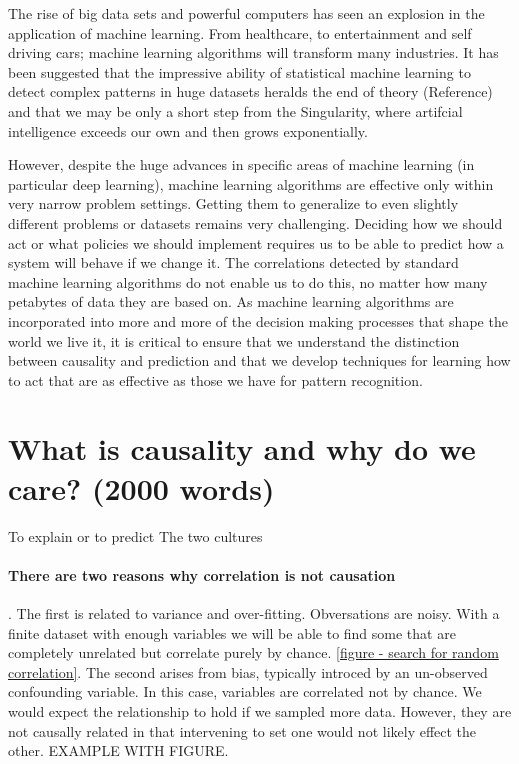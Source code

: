 \documentclass[11pt,a4paper,oneside]{book}
\begin{document}
The rise of big data sets and powerful computers has seen an explosion in the application of machine learning. From healthcare, to entertainment and self driving cars; machine learning algorithms will transform many industries. It has been suggested that the impressive ability of statistical machine learning to detect complex patterns in huge datasets heralds the end of theory (Reference) and that we may be only a short step from the Singularity, where artifcial intelligence exceeds our own and then grows exponentially. 

However, despite the huge advances in specific areas of machine learning (in particular deep learning), machine learning algorithms are effective only within very narrow problem settings. Getting them to generalize to even slightly different problems or datasets remains very challenging. Deciding how we should act or what policies we should implement requires us to be able to predict how a system will behave if we change it. The correlations detected by standard machine learning algorithms do not enable us to do this, no matter how many petabytes of data they are based on. As machine learning algorithms are incorporated into more and more of the decision making processes that shape the world we live it, it is critical to ensure that we understand the distinction between causality and prediction and that we develop techniques for learning how to act that are as effective as those we have for pattern recognition.


\section*{What is causality and why do we care? (2000 words)}

To explain or to predict \cite{Shmueli2010}
The two cultures \cite{Breiman2001}

\paragraph*{There are two reasons why correlation is not causation}. The first is related to variance and over-fitting. Obversations are noisy. With a finite dataset with enough variables we will be able to find some that are completely unrelated but correlate purely by chance. \ref{figure - search for random correlation}. The second arises from bias, typically introced by an un-observed confounding variable. In this case, variables are correlated not by chance. We would expect the relationship to hold if we sampled more data. However, they are not causally related in that intervening to set one would not likely effect the other. EXAMPLE WITH FIGURE. 
\end{document}
